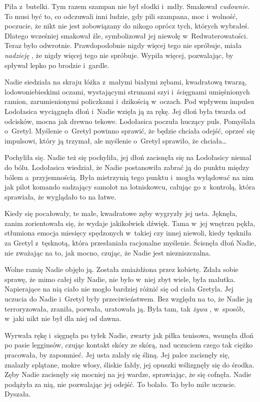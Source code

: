 \documentclass[oneside,polish,11pt,sfheadings]{mwbk}
\begin{document}
Piła z~butelki. Tym razem szampan nie był słodki i~mdły. Smakował
\textit{cudownie}. To musi być to, co odczuwali inni ludzie, gdy pili
szampana, moc i~wolność, poczucie, że nikt nie jest zobowiązany do
nikogo oprócz tych, których wybrałeś. Dlatego wcześniej smakował źle,
symbolizował jej niewolę w~Redwaterowatości. Teraz było odwrotnie.
Prawdopodobnie nigdy więcej tego nie spróbuje, miała \textit{nadzieję },
że nigdy więcej tego nie spróbuje. Wypiła więcej, pozwalając, by spływał
lepko po brodzie i~gardle.

Nadie siedziała na skraju łóżka z~małymi białymi zębami, kwadratową
twarzą, lodowoniebieskimi oczami, wystającymi strunami szyi i~ścięgnami
umięśnionych ramion, zarumienionymi policzkami i~dzikością w~oczach. Pod
wpływem impulsu Lodołasica wyciągnęła dłoń i~Nadie wzięła ją za rękę.
Jej dłoń była twarda od odcisków, mocna jak drewno tekowe. Lodołasica
poczuła huczący puls. Pomyślała o~Gretyl. Myślenie o~Gretyl powinno
sprawić, że będzie chciała odejść, oprzeć się impulsowi, który ją
trzymał, ale myślenie o~Gretyl sprawiło, że chciała\ldots 

Pochyliła się. Nadie też się pochyliła, jej dłoń zacisnęła się na
Lodołasicy niemal do bólu. Lodołasica wiedział, że Nadie postanowiła
zabrać ją do punktu między bólem a~przyjemnością. Była mistrzynią tego
punktu i~mogła wylądować na nim jak pilot komando sadzający samolot na
lotniskowcu, całując go z~kontrolą, która sprawiała, że wyglądało to na
łatwe.

Kiedy się pocałowały, te małe, kwadratowe zęby wygryzły jej usta.
Jęknęła, zanim zorientowała się, że wydaje jakikolwiek dźwięk. Tama w~jej wnętrzu pękła, stłumiona emocja miesięcy spędzonych w~takiej czy
innej niewoli, kiedy tęskniła za Gretyl z~tęsknotą, która przesłaniała
racjonalne myślenie. Ścisnęła dłoń Nadie, nie zważając na to, jak mocno,
czując, że Nadie jest niezniszczalna.

Wolne ramię Nadie objęło ją. Została zmiażdżona przez kobietę. Zdała
sobie sprawę, że mimo całej siły Nadie, nie było w~niej zbyt wiele, była
malutka. Napierające na nią ciało nie mogło bardziej różnić się od ciała
Gretyla. Jej uczucia do Nadie i~Gretyl były przeciwieństwem. Bez względu
na to, że Nadie ją terroryzowała, zraniła, porwała, uratowała ją. Była
tam, tak \textit{żywa }, w~sposób, w~jaki nikt nie był dla niej od dawna.

Wyrwała rękę i~sięgnęła po tyłek Nadie, zwarty jak piłka tenisowa,
wsunęła dłoń po pasie legginsów, czując kontakt skóry ze skórą, nad
uczuciem czego tak ciężko pracowała, by zapomnieć. Jej usta zalały się
śliną. Jej palce zacisnęły się, znalazły splątane, mokre włosy, śliskie
fałdy, jej opuszki wślizgnęły się do środka. Zęby Nadie zacisnęły się
mocniej na jej wardze, sprawiając, że się cofnęła. Nadie podążyła za
nią, nie pozwalając jej odejść. To bolało. To było miłe uczucie.
Dyszała.
\end{document}
